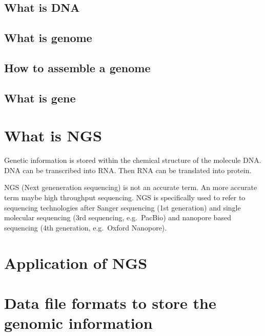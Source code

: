 \documentclass[]{book}
\begin{document}
\hypertarget{what-is-dna}{%
\subsection{What is DNA}\label{what-is-dna}}

\hypertarget{what-is-genome}{%
\subsection{What is genome}\label{what-is-genome}}

\hypertarget{how-to-assemble-a-genome}{%
\subsection{How to assemble a genome}\label{how-to-assemble-a-genome}}

\hypertarget{what-is-gene}{%
\subsection{What is gene}\label{what-is-gene}}

\hypertarget{what-is-ngs}{%
\section{What is NGS}\label{what-is-ngs}}

Genetic information is stored within the chemical structure of the molecule DNA. DNA can be transcribed into RNA. Then RNA can be translated into protein.

NGS (Next geneneration sequencing) is not an accurate term. An more accurate term maybe high throughput sequencing. NGS is specifically used to refer to sequencing technologies after Sanger sequencing (1st generation) and single molecular sequencing (3rd sequencing, e.g.~PacBio) and nanopore based sequencing (4th generation, e.g.~Oxford Nanopore).

\hypertarget{application-of-ngs}{%
\section{Application of NGS}\label{application-of-ngs}}

\hypertarget{section-1}{%
\section{}\label{section-1}}

\hypertarget{data-file-formats-to-store-the-genomic-information}{%
\section{Data file formats to store the genomic information}\label{data-file-formats-to-store-the-genomic-information}}
\end{document}
